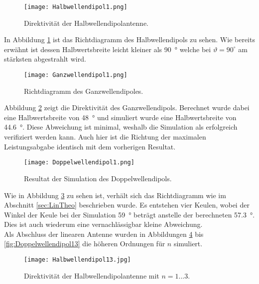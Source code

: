 \begin{figure}[!ht]
	\centering
    \texttt{[image: Halbwellendipol1.png]}
    \caption{Direktivität der Halbwellendipolantenne.}
    \label{fig:Halbwellendipol1}
\end{figure}

In Abbildung \ref{fig:Halbwellendipol1} ist das Richtdiagramm des Halbwellendipols zu sehen. Wie bereits erwähnt ist dessen Halbwertsbreite leicht kleiner als \SI{90}{\degree} welche bei $\vartheta = 90^\circ$ am stärksten abgestrahlt wird.

\begin{figure}[!ht]
	\centering
    \texttt{[image: Ganzwellendipol1.png]}
    \caption{Richtdiagramm des Ganzwellendipoles.}
    \label{fig:Ganzwellendipol1}
\end{figure}

Abbildung \ref{fig:Ganzwellendipol1} zeigt die Direktivität des Ganzwellendipols. Berechnet wurde dabei eine Halbwertsbreite von \SI{48}{\degree} und simuliert wurde eine Halbwertsbreite von \SI{44.6}{\degree}. Diese Abweichung ist minimal, weshalb die Simulation als erfolgreich verifiziert werden kann. Auch hier ist die Richtung der maximalen Leistungsabgabe identisch mit dem vorherigen Resultat.

\begin{figure}[!ht]
	\centering
    \texttt{[image: Doppelwellendipol1.png]}
    \caption{Resultat der Simulation des Doppelwellendipols.}
    \label{fig:Doppelwellendipol1}
\end{figure}

Wie in Abbildung \ref{fig:Doppelwellendipol1} zu sehen ist, verhält sich das Richtdiagramm wie im Abschnitt \ref{sec:LinTheo} beschrieben wurde. Es entstehen vier Keulen, wobei der Winkel der Keule bei der Simulation \SI{59}{\degree} beträgt anstelle der berechneten \SI{57.3}{\degree}. Dies ist auch wiederum eine vernachlässigbar kleine Abweichung.\\

Als Abschluss der linearen Antenne wurden in Abbildungen \ref{fig:Halbwellendipol13} bis \ref{fig:Doppelwellendipol13} die höheren Ordnungen für $n$ simuliert. 

\newpage

\begin{figure}[!ht]
	\centering
    \texttt{[image: Halbwellendipol13.jpg]}
    \caption{Direktivität der Halbwellendipolantenne mit $n = 1 ... 3$.}
    \label{fig:Halbwellendipol13}
\end{figure}

